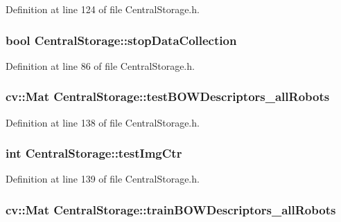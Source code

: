 \-Definition at line 124 of file \-Central\-Storage.\-h.

\hypertarget{classCentralStorage_ac721895aafa60a4fb37c9659aabaed7a}{
\subsubsection[{stop\-Data\-Collection}]{\setlength{\rightskip}{0pt plus 5cm}bool {\bf \-Central\-Storage\-::stop\-Data\-Collection}}}\label{classCentralStorage_ac721895aafa60a4fb37c9659aabaed7a}


\-Definition at line 86 of file \-Central\-Storage.\-h.

\hypertarget{classCentralStorage_ab3aae9d93bbccd2a646330cb8812824f}{
\subsubsection[{test\-B\-O\-W\-Descriptors\-\_\-all\-Robots}]{\setlength{\rightskip}{0pt plus 5cm}cv\-::\-Mat {\bf \-Central\-Storage\-::test\-B\-O\-W\-Descriptors\-\_\-all\-Robots}}}\label{classCentralStorage_ab3aae9d93bbccd2a646330cb8812824f}


\-Definition at line 138 of file \-Central\-Storage.\-h.

\hypertarget{classCentralStorage_ac6ecd35e9f6a9d0145f87fb98c6fb923}{
\subsubsection[{test\-Img\-Ctr}]{\setlength{\rightskip}{0pt plus 5cm}int {\bf \-Central\-Storage\-::test\-Img\-Ctr}}}\label{classCentralStorage_ac6ecd35e9f6a9d0145f87fb98c6fb923}


\-Definition at line 139 of file \-Central\-Storage.\-h.

\hypertarget{classCentralStorage_ad22679ec76d8fc9c99226a1bfdd4c410}{
\subsubsection[{train\-B\-O\-W\-Descriptors\-\_\-all\-Robots}]{\setlength{\rightskip}{0pt plus 5cm}cv\-::\-Mat {\bf \-Central\-Storage\-::train\-B\-O\-W\-Descriptors\-\_\-all\-Robots}}}\label{classCentralStorage_ad22679ec76d8fc9c99226a1bfdd4c410}


